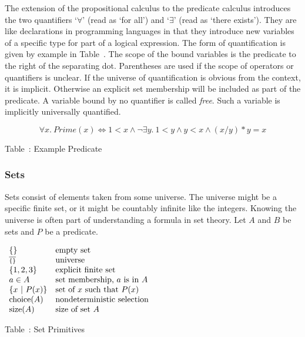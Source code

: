 \setcounter{LogicExamples}{\value{table}}

The extension of the propositional calculus to the predicate calculus 
introduces the two quantifiers `$\forall$' (read as `for all') 
and `$\exists$' (read as `there exists').  
They are like declarations in programming languages in that they introduce 
new variables of a specific type for part of a logical expression.  
The form of quantification is given by example in Table~\thetable.  
The scope of the bound variables is the predicate to the right of the 
separating dot.
Parentheses are used if the scope of operators or quantifiers is unclear.  
If the universe of quantification is obvious from the context, it is implicit.  
Otherwise an explicit set membership will be included as part of the predicate.  
A variable bound by no quantifier is called {\em free}.  
Such a variable is implicitly universally quantified.

\begin{displaymath}
\forall x.\ Prime(x) \Leftrightarrow 1 < x \wedge 
\neg \exists y.\ 1 < y \wedge y < x \wedge (x/y)*y=x 
\end{displaymath}

\begin{center}
Table~\thetable: Example Predicate
\end{center}

\subsubsection{Sets}

\setcounter{SetDefinitions}{\value{table}}

\noindent Sets consist of elements taken from some universe.  
The universe might be a specific finite set, or it might be countably 
infinite like the integers.  
Knowing the universe is often part of understanding a 
formula in set theory.  Let $A$ and $B$ be sets and $P$ be a 
predicate. 

\begin{samepage}
\begin{center}
$
\begin{array}{ll}
\{\}                & \mbox{empty set}                      \\
\mbox{$\overline{\scriptstyle\{\}}$}           & \mbox{universe}                       \\
\{1, 2, 3\}         & \mbox{explicit finite set}            \\
a \in A             & \mbox{set membership, $a$ is in $A$}  \\
\{x\ |\ P(x)\}      & \mbox{set of $x$ such that $P(x)$}    \\
{\rm choice}(A)     & \mbox{nondeterministic selection}     \\
{\rm size}(A)       & \mbox{size of set $A$}
\end{array}
$

Table~\thetable: Set Primitives
\end{center}
\end{samepage}

